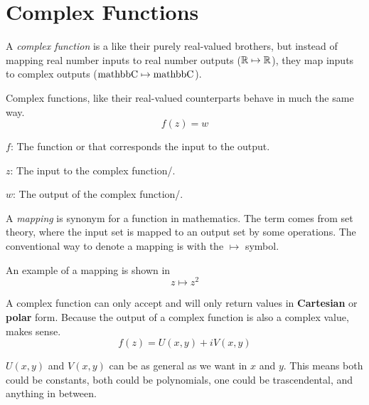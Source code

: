 \section{Complex Functions}\label{sec:Complex_Functions}
\begin{definition}\label{def:Complex_Function}
  A \emph{complex function} is a like their purely real-valued brothers, but instead of mapping real number inputs to real number outputs ($\operatorname{\mathbb{R}} \mapsto \operatorname{\mathbb{R}}$), they map  inputs to complex outputs ($\operatorname{mathbb{C}} \mapsto \operatorname{mathbb{C}}$).

  Complex functions, like their real-valued counterparts behave in much the same way.
  \begin{equation}\label{eq:Complex_Function}
    f(z) = w
  \end{equation}
  \begin{description}[noitemsep]
  \item $f$: The function or  that corresponds the input to the output.
  \item $z$: The input to the complex function/.
  \item $w$: The output of the complex function/.
  \end{description}
\end{definition}


\begin{definition}[Mapping]\label{def:Mapping}
  A \emph{mapping} is synonym for a function in mathematics.
  The term comes from set theory, where the input set is mapped to an output set by some operations.
  The conventional way to denote a mapping is with the $\mapsto$ symbol.

  An example of a mapping is shown in 
  \begin{equation}\label{eq:Mapping}
    z \mapsto z^{2}
  \end{equation}
\end{definition}

A complex function can only accept and will only return values in \textbf{Cartesian} or \textbf{polar} form.
Because the output of a complex function is also a complex value,  makes sense.
\begin{equation}\label{eq:Output_Value_Function}
  f(z) = U(x, y) + iV(x, y)
\end{equation}

$U(x, y)$ and $V(x, y)$ can be as general as we want in $x$ and $y$.
This means both could be constants, both could be polynomials, one could be trascendental, and anything in between.

